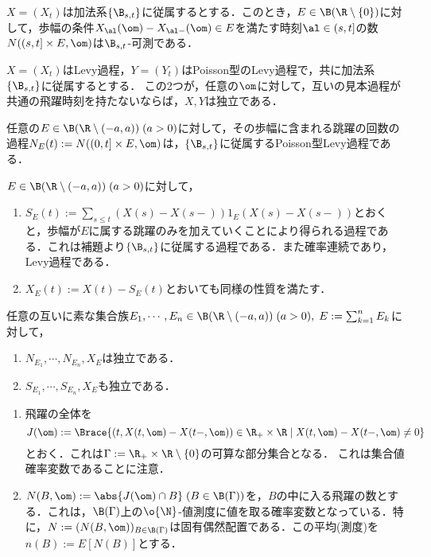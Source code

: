 \documentclass[uplatex,dvipdfmx]{jsreport}
\begin{document}
\begin{lemma}
    $X=(X_t)$は加法系$\{\B_{s,t}\}$に従属するとする．このとき，$E\in\B(\R\setminus\{0\})$に対して，歩幅の条件$X_\al(\om)-X_{\al-}(\om)\in E$を満たす時刻$\al\in(s,t]$の数$N((s,t]\times E,\om)$は$\B_{s,t}$-可測である．
\end{lemma}

\begin{lemma}[独立性の十分条件]
    $X=(X_t)$はLevy過程，$Y=(Y_t)$はPoisson型のLevy過程で，共に加法系$\{\B_{s,t}\}$に従属するとする．
    この2つが，任意の$\om$に対して，互いの見本過程が共通の飛躍時刻を持たないならば，$X,Y$は独立である．
\end{lemma}

\begin{lemma}
    任意の$E\in\B(\R\setminus(-a,a))\;(a>0)$に対して，その歩幅に含まれる跳躍の回数の過程$N_E(t):=N((0,t]\times E,\om)$は，$\{\B_{s,t}\}$に従属するPoisson型Levy過程である．
\end{lemma}

\begin{notation}
    $E\in\B(\R\setminus(-a,a))\;(a>0)$に対して，
    \begin{enumerate}
        \item $S_E(t):=\sum_{s\le t}(X(s)-X(s-))1_E(X(s)-X(s-))$とおくと，歩幅が$E$に属する跳躍のみを加えていくことにより得られる過程である．これは補題より$\{\B_{s,t}\}$に従属する過程である．また確率連続であり，Levy過程である．
        \item $X_E(t):=X(t)-S_E(t)$とおいても同様の性質を満たす．
    \end{enumerate}
\end{notation}

\begin{lemma}
    任意の互いに素な集合族$E_1,\cdots,E_n\in\B(\R\setminus(-a,a))\;(a>0),\;E:=\sum_{k=1}^nE_k$に対して，
    \begin{enumerate}
        \item $N_{E_1},\cdots,N_{E_n},X_E$は独立である．
        \item $S_{E_1},\cdots,S_{E_n},X_E$も独立である．
    \end{enumerate}
\end{lemma}

\begin{notation}\mbox{}
    \begin{enumerate}
        \item 飛躍の全体を
        \[J(\om):=\Brace{(t,X(t,\om)-X(t-,\om))\in\R_+\times\R\mid X(t,\om)-X(t-,\om)\ne0}\]
        とおく．これは$\Gamma:=\R_+\times\R\setminus\{0\}$の可算な部分集合となる．
        これは集合値確率変数であることに注意．
        \item $N(B,\om):=\abs{J(\om)\cap B}\;(B\in\B(\Gamma))$を，$B$の中に入る飛躍の数とする．これは，$\B(\Gamma)$上の$\o{\N}$-値測度に値を取る確率変数となっている．特に，$N:=(N(B,\om))_{B\in\B(\Gamma)}$は固有偶然配置である．この平均(測度)を$n(B):=E[N(B)]$とする．
    \end{enumerate}
\end{notation}
\end{document}
